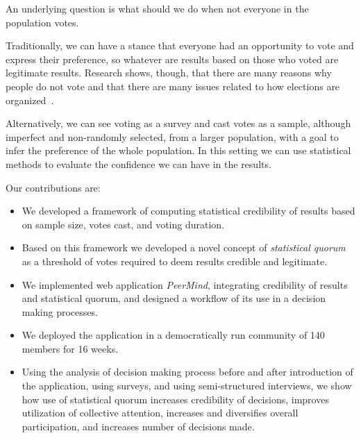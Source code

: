 \documentclass[format=acmsmall, review=true, screen=true, anonymous=true]{acmart}
\begin{document}
An underlying question is what should we do when not everyone in the population votes.

Traditionally, we can have a stance that everyone had an opportunity to vote and express
their preference, so whatever are results based on those who voted are legitimate results.
Research shows, though, that there are many reasons why people do not vote and that there
are many issues related to how elections are organized~\cite{CANCELA2016264, GIMPEL2003471}.

Alternatively, we can see voting as a survey and cast votes as a sample, although imperfect
and non-randomly selected, from a larger population, with a goal to infer the preference
of the whole population. In this setting we can use statistical methods to evaluate the
confidence we can have in the results.


Our contributions are:

\begin{itemize}
\item We developed a framework of computing statistical credibility of results
based on sample size, votes cast, and voting duration.
\item Based on this framework we developed a novel concept of \emph{statistical quorum}
as a threshold of votes required to deem results credible and legitimate.
\item We implemented web application \emph{PeerMind},
integrating credibility of results and statistical quorum, and designed
a workflow of its use in a decision making processes.
\item We deployed the application in a democratically run community of 140
members for 16 weeks.
\item Using the analysis of decision making process before and after introduction
of the application, using surveys, and using semi-structured interviews, we show
how use of statistical quorum increases credibility of decisions,
improves utilization of collective attention, increases and diversifies overall participation,
and increases number of decisions made.
\end{itemize}
\end{document}
